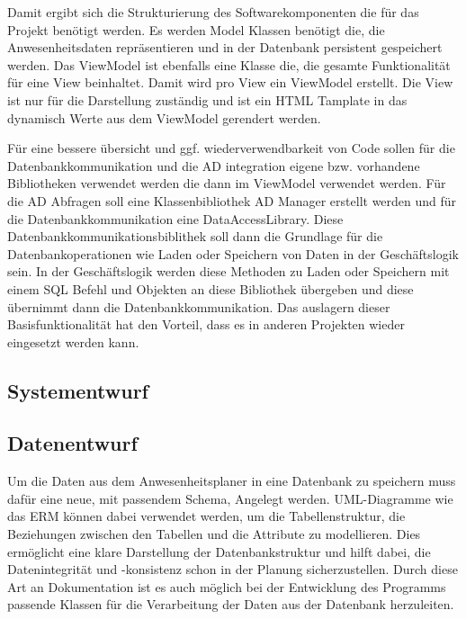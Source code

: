 Damit ergibt sich die Strukturierung des Softwarekomponenten die für das Projekt benötigt werden. Es werden Model Klassen benötigt die, die Anwesenheitsdaten repräsentieren und in der Datenbank persistent gespeichert werden. Das ViewModel ist ebenfalls eine Klasse die, die gesamte Funktionalität für eine View beinhaltet. Damit wird pro View ein ViewModel erstellt. Die View ist nur für die Darstellung zuständig und ist ein HTML Tamplate in das dynamisch Werte aus dem ViewModel gerendert werden.

Für eine bessere übersicht und ggf. wiederverwendbarkeit von Code sollen für die Datenbankkommunikation und die AD integration eigene bzw. vorhandene Bibliotheken verwendet werden die dann im ViewModel verwendet werden. Für die AD Abfragen soll eine Klassenbibliothek AD Manager erstellt werden und für die Datenbankkommunikation eine DataAccessLibrary. Diese Datenbankkommunikationsbiblithek soll dann die Grundlage für die Datenbankoperationen wie Laden oder Speichern von Daten in der Geschäftslogik sein. In der Geschäftslogik werden diese Methoden zu Laden oder Speichern mit einem SQL Befehl und Objekten an diese Bibliothek übergeben und diese übernimmt dann die Datenbankkommunikation. Das auslagern dieser Basisfunktionalität hat den Vorteil, dass es in anderen Projekten wieder eingesetzt werden kann.

\subsection{Systementwurf}
\label{sec:Systementwurf}




\subsection{Datenentwurf}
\label{sec:Datenentwurf}
Um die Daten aus dem Anwesenheitsplaner in eine Datenbank zu speichern muss dafür eine neue, mit passendem Schema, Angelegt werden. UML-Diagramme wie das ERM können dabei verwendet werden, um die Tabellenstruktur, die Beziehungen zwischen den Tabellen und die Attribute zu modellieren. Dies ermöglicht eine klare Darstellung der Datenbankstruktur und hilft dabei, die Datenintegrität und -konsistenz schon in der Planung sicherzustellen. Durch diese Art an Dokumentation ist es auch möglich bei der Entwicklung des Programms passende Klassen für die Verarbeitung der Daten aus der Datenbank herzuleiten.

